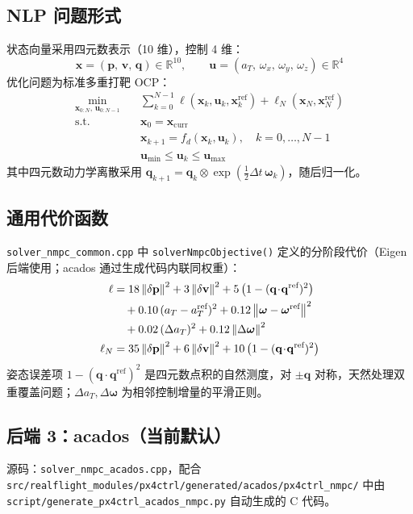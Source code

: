 \documentclass[UTF8, a4paper, 11pt]{ctexart}
\newcommand{\R}{\mathbb{R}}
\newcommand{\bx}{\mathbf{x}}
\newcommand{\bu}{\mathbf{u}}
\newcommand{\bp}{\mathbf{p}}
\newcommand{\bv}{\mathbf{v}}
\newcommand{\bq}{\mathbf{q}}
\newcommand{\bw}{\boldsymbol{\omega}}
\newcommand{\norm}[1]{\left\|#1\right\|}
\begin{document}
\subsection{NLP 问题形式}

状态向量采用四元数表示（10 维），控制 4 维：
\begin{equation}
  \bx = (\bp,\,\bv,\,\bq) \in \R^{10}, \qquad \bu = (a_T,\,\omega_x,\,\omega_y,\,\omega_z) \in \R^4
\end{equation}
优化问题为标准多重打靶 OCP：
\begin{align}
  \min_{\bx_{0:N},\,\bu_{0:N-1}}\quad & \sum_{k=0}^{N-1}\ell(\bx_k,\bu_k,\bx_k^{\text{ref}}) + \ell_N(\bx_N,\bx_N^{\text{ref}})\\
  \text{s.t.}\quad & \bx_0 = \bx_{\text{curr}}\\
  & \bx_{k+1} = f_d(\bx_k,\bu_k),\quad k=0,\dots,N-1\\
  & \bu_{\min}\leq\bu_k\leq\bu_{\max}
\end{align}
其中四元数动力学离散采用 $\bq_{k+1} = \bq_k \otimes \exp\!\left(\tfrac{1}{2}\Delta t\,\bw_k\right)$，随后归一化。

\subsection{通用代价函数}

\texttt{solver\_nmpc\_common.cpp} 中 \texttt{solverNmpcObjective()} 定义的分阶段代价（Eigen 后端使用；acados 通过生成代码内联同权重）：
\begin{align}
  \ell &= 18\norm{\delta\bp}^2 + 3\norm{\delta\bv}^2 + 5\left(1-(\bq\!\cdot\!\bq^{\text{ref}})^2\right)\notag\\
       &\quad + 0.10\,(a_T-a_T^{\text{ref}})^2 + 0.12\norm{\bw-\bw^{\text{ref}}}^2\notag\\
       &\quad + 0.02\,(\Delta a_T)^2 + 0.12\norm{\Delta\bw}^2\\
  \ell_N &= 35\norm{\delta\bp}^2 + 6\norm{\delta\bv}^2 + 10\left(1-(\bq\!\cdot\!\bq^{\text{ref}})^2\right)
\end{align}
姿态误差项 $1-(\bq\cdot\bq^{\text{ref}})^2$ 是四元数点积的自然测度，对 $\pm\bq$ 对称，天然处理双重覆盖问题；$\Delta a_T, \Delta\bw$ 为相邻控制增量的平滑正则。

\subsection{后端 3：acados（当前默认）}

源码：\texttt{solver\_nmpc\_acados.cpp}，配合 \texttt{src/realflight\_modules/px4ctrl/generated/acados/px4ctrl\_nmpc/} 中由 \texttt{script/generate\_px4ctrl\_acados\_nmpc.py} 自动生成的 C 代码。
\end{document}
